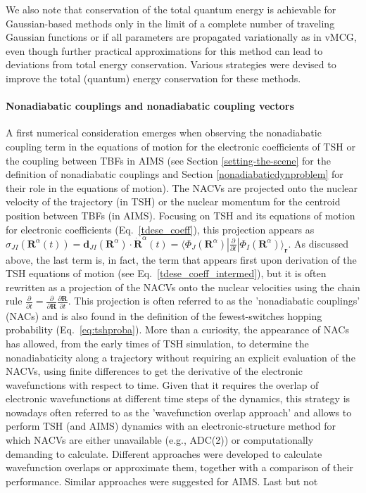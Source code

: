 \documentclass[9pt,bestpractices,pubversion]{livecoms}
\newcommand{\bra}[1]{\langle #1|}
\newcommand{\ket}[1]{|#1\rangle}
\newcommand{\bs}{\mathbf}
\begin{document}
We also note that conservation of the total quantum energy is achievable for Gaussian-based methods only in the limit of a complete number of traveling Gaussian functions\cite{habershon2012} or if all parameters are propagated variationally as in vMCG\cite{richings2015quantum}, even though further practical approximations for this method can lead to deviations from total energy conservation.\cite{christopoulou2021developing} Various strategies were devised to improve the total (quantum) energy conservation for these methods.\cite{izmaylov2022}

\paragraph{Nonadiabatic couplings and nonadiabatic coupling vectors} 

A first numerical consideration emerges when observing the nonadiabatic coupling term in the equations of motion for the electronic coefficients of TSH or the coupling between TBFs in AIMS (see Section \ref{setting-the-scene} for the definition of nonadiabatic couplings and Section \ref{nonadiabaticdynproblem} for their role in the equations of motion). The NACVs are projected onto the nuclear velocity of the trajectory (in TSH) or the nuclear momentum for the centroid position between TBFs (in AIMS). Focusing on TSH and its equations of motion for electronic coefficients (Eq.~\eqref{tdese_coeff}), this projection appears as $\sigma_{JI}(\bs R^{\alpha}(t))=\bs d_{JI}\left(\bs R^{\alpha}\right)\cdot \dot{\bs R}^{\alpha}(t) = \bra{\Phi_J(\bs R^{\alpha})}\frac{\partial}{\partial t}\ket{\Phi_I(\bs R^{\alpha})}_{\mathbf{r}}$.\cite{hammes94} As discussed above, the last term is, in fact, the term that appears first upon derivation of the TSH equations of motion (see Eq.~\eqref{tdese_coeff_intermed}), but it is often rewritten as a projection of the NACVs onto the nuclear velocities using the chain rule $\frac{\partial}{\partial t} = \frac{\partial}{\partial \bs R}\frac{\partial \bs R}{\partial t}$. This projection is often referred to as the 'nonadiabatic couplings' (NACs) and is also found in the definition of the fewest-switches hopping probability (Eq.~\eqref{eq:tshproba}). More than a curiosity, the appearance of NACs has allowed, from the early times of TSH simulation, to determine the nonadiabaticity along a trajectory without requiring an explicit evaluation of the NACVs, using finite differences to get the derivative of the electronic wavefunctions with respect to time.\cite{hammes94} Given that it requires the overlap of electronic wavefunctions at different time steps of the dynamics, this strategy is nowadays often referred to as the 'wavefunction overlap approach' and allows to perform TSH (and AIMS) dynamics with an electronic-structure method for which NACVs are either unavailable (e.g., ADC(2)) or computationally demanding to calculate. Different approaches were developed to calculate wavefunction overlaps\cite{tapavicza07,mitric2008nonadiabatic,PITTNER2009147,meek2014tdc,Ryabinkin2015,plasser2016,Xiaorui2023} or approximate them,\cite{baeck-an2017} together with a comparison of their performance.\cite{merritt2023} Similar approaches were suggested for AIMS.\cite{levine2008implementation,tao2009ab} Last but not 
\end{document}
